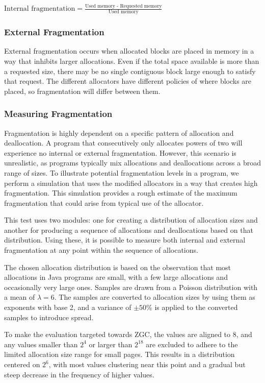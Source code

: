 $\text{Internal fragmentation} = \frac{\text{Used memory - Requested memory}}{\text{Used memory}}$

\subsubsection{External Fragmentation}
External fragmentation occurs when allocated blocks are placed in memory in a way that inhibits larger allocations. Even if the total space available is more than a requested size, there may be no single contiguous block large enough to satisfy that request. The different allocators have different policies of where blocks are placed, so fragmentation will differ between them.

\subsubsection{Measuring Fragmentation}
Fragmentation is highly dependent on a specific pattern of allocation and deallocation. A program that consecutively only allocates powers of two will experience no internal or external fragmentation. However, this scenario is unrealistic, as programs typically mix allocations and deallocations across a broad range of sizes. To illustrate potential fragmentation levels in a program, we perform a simulation that uses the modified allocators in a way that creates high fragmentation. This simulation provides a rough estimate of the maximum fragmentation that could arise from typical use of the allocator.

This test uses two modules: one for creating a distribution of allocation sizes and another for producing a sequence of allocations and deallocations based on that distribution. Using these, it is possible to measure both internal and external fragmentation at any point within the sequence of allocations.

\newpage
The chosen allocation distribution is based on the observation that most allocations in Java programs are small, with a few large allocations and occasionally very large ones. Samples are drawn from a Poisson distribution with a mean of $\lambda = 6$. The samples are converted to allocation sizes by using them as exponents with base 2, and a variance of $\pm 50\%$ is applied to the converted samples to introduce spread.

To make the evaluation targeted towards ZGC, the values are aligned to $8$, and any values smaller than $2^4$ or larger than $2^{18}$ are excluded to adhere to the limited allocation size range for small pages. This results in a distribution centered on $2^6$, with most values clustering near this point and a gradual but steep decrease in the frequency of higher values.

